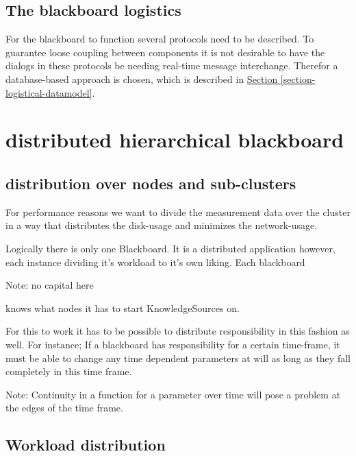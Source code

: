 \documentclass[]{lofar}
\begin{document}
    \subsection{The blackboard logistics}
    \label{id2721238}\hypertarget{id2721238}{}%

      For the blackboard to function several protocols need to be
      described. To guarantee loose coupling between components it is
      not desirable to have the dialogs in these protocols be needing
      real-time message interchange. Therefor a database-based
      approach is chosen, which is described in
      \hyperlink{section-logistical-datamodel}{Section
      \ref{section-logistical-datamodel}}.

  \section{distributed hierarchical blackboard}
  \label{id2721216}\hypertarget{id2721216}{}%

    \subsection{distribution over nodes and sub-clusters}
    \label{id2721220}\hypertarget{id2721220}{}%

      For performance reasons we want to divide the measurement data
      over the cluster in a way that distributes the disk-usage and
      minimizes the network-usage.

      Logically there is only one Blackboard. It is a distributed
      application however, each instance dividing it's workload to
      it's own liking. Each blackboard
      \begin{em}\large{Note: }
        no capital here
      \end{em}
      knows what nodes it has to start KnowledgeSources on.

      For this to work it has to be possible to distribute
      responsibility in this fashion as well. For instance; If a
      blackboard has responsibility for a certain time-frame, it must
      be able to change any time dependent parameters at will as long
      as they fall completely in this time frame.
      \begin{em}\large{Note: }Continuity in a function for a parameter over time will pose a problem at the edges of the time frame.\end{em}

    \subsection{Workload distribution}
    \label{id2721283}\hypertarget{id2721283}{}%
\end{document}
